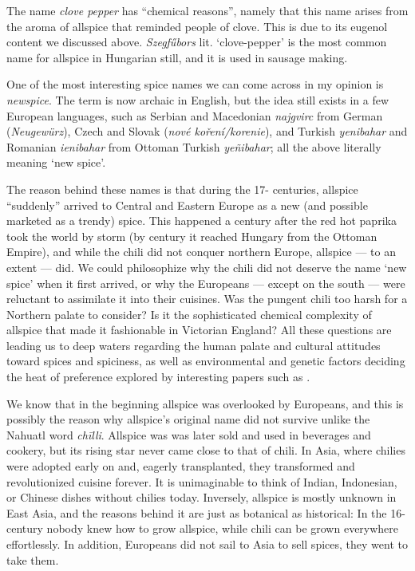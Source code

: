 The name \textit{clove pepper}  has ``chemical reasons'', namely that this name arises from the aroma of allspice that reminded people of clove. This is due to its eugenol content we discussed above. \textit{Szegfűbors} lit. `clove-pepper' is the most common name for allspice in Hungarian still, and it is used in sausage making.

One of the most interesting spice names we can come across in my opinion is  \textit{newspice}. The term is now archaic in English, but the idea still exists in a few European languages, such as Serbian and Macedonian  \textit{najgvirc} from German (\textit{Neugewürz}), Czech and Slovak (\textit{nové koření/korenie}), and Turkish \textit{yenibahar} and Romanian \textit{ienibahar} from Ottoman Turkish  \textit{yeñibahar}; all the above literally meaning `new spice'.

The reason behind these names is that during the 17- centuries, allspice ``suddenly'' arrived to Central and Eastern Europe as a new (and possible marketed as a trendy) spice. This happened a century after the red hot paprika took the world by storm (by  century it reached Hungary from the Ottoman Empire), and while the chili did not conquer northern Europe, allspice --- to an extent --- did. We could philosophize why the chili did not deserve the name `new spice' when it first arrived, or why the Europeans --- except on the south --- were reluctant to assimilate it into their cuisines. Was the pungent chili too harsh for a Northern palate to consider? Is it the sophisticated chemical complexity of allspice that made it fashionable in Victorian England? All these questions are leading us to deep waters regarding the human palate and cultural attitudes toward spices and spiciness, as well as environmental and genetic factors deciding the heat of preference explored by interesting papers such as \textcite{tornwall_why_2012,spence_why_2018}.

We know that in the beginning allspice was overlooked by Europeans, and this is possibly the reason why allspice's original name did not survive unlike the Nahuatl word \textit{chīlli}. Allspice was was later sold and used in beverages and cookery, but its rising star never came close to that of chili.
In Asia, where chilies were adopted early on and, eagerly transplanted, they transformed and revolutionized cuisine forever. It is unimaginable to think of Indian, Indonesian, or Chinese dishes without chilies today. Inversely, allspice is mostly unknown in East Asia, and the reasons behind it are just as botanical as historical: In the 16- century nobody knew how to grow allspice, while chili can be grown everywhere effortlessly. In addition, Europeans did not sail to Asia to sell spices, they went to take them. 

